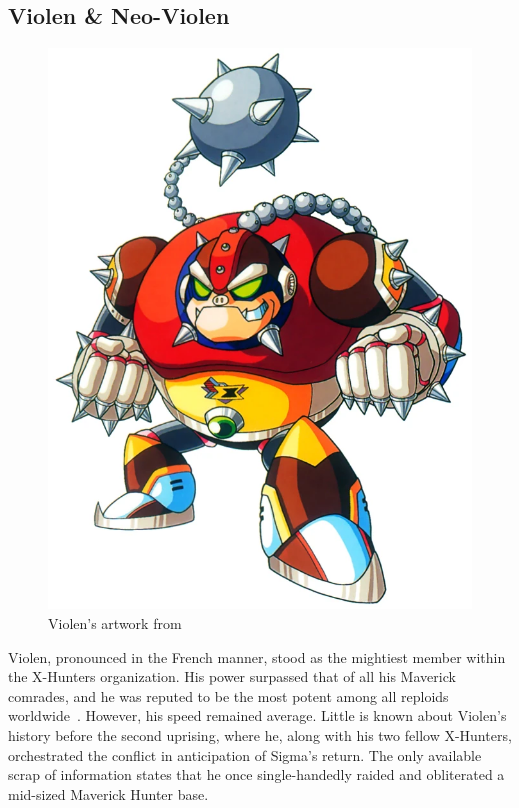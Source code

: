 \subsection{Violen \& Neo-Violen}\label{boss:Neo-Violen}
\begin{figure}[htp]
	\centering
	\includegraphics[height=\portraitsize]{figures/X2/Hunter_stages/Violen.png}
	\caption{Violen's artwork from \cite{book:MMX_Complete_art}}
\end{figure}
Violen, pronounced in the French manner, stood as the mightiest member within the X-Hunters organization. His power surpassed that of all his Maverick comrades, and he was reputed to be the most potent among all reploids worldwide~\cite{wayback:X2_resources}. However, his speed remained average. Little is known about Violen's history before the second uprising, where he, along with his two fellow X-Hunters, orchestrated the conflict in anticipation of Sigma's return. The only available scrap of information states that he once single-handedly raided and obliterated a mid-sized Maverick Hunter base.

